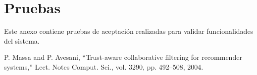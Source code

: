 \documentclass[12pt,letterpaper,openany]{book}
\begin{document}
\chapter{Pruebas}\label{aped.C}
Este anexo contiene pruebas de aceptación realizadas para validar funcionalidades del sistema.	






\begin{thebibliography}{1}
 P. Massa and P. Avesani, “Trust-aware collaborative filtering for recommender systems,” Lect. Notes Comput. Sci., vol. 3290, pp. 492–508, 2004.
\end{thebibliography}
\end{document}
